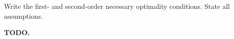 Write the first- and second-order necessary optimality conditions. State all assumptions.

\begin{solution}
    \bf{TODO.}
    \ \\
    \vfill
\end{solution}